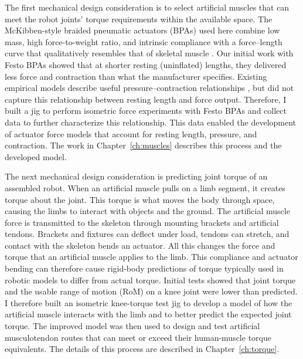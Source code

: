 The first mechanical design consideration is to select artificial muscles that can meet the robot joints' torque requirements within the available space. The McKibben-style braided pneumatic actuators (BPAs) used here combine low mass, high force-to-weight ratio, and intrinsic compliance with a force--length curve that qualitatively resembles that of skeletal muscle \citep{liang_comparative_2020, hunt_modeling_2017}. Our initial work with Festo BPAs showed that at shorter resting (uninflated) lengths, they delivered less force and contraction than what the manufacturer specifies. Existing empirical models describe useful pressure--contraction relationships \citep{sarosi_comparative_2017, martens_modeling_2017, hunt_modeling_2017}, but did not capture this relationship between resting length and force output. Therefore, I built a jig to perform isometric force experiments with Festo BPAs and collect data to further characterize this relationship. This data enabled the development of actuator force models that account for resting length, pressure, and contraction. The work in Chapter~\ref{ch:muscles} describes this process and the developed model.

The next mechanical design consideration is predicting joint torque of an assembled robot. When an artificial muscle pulls on a limb segment, it creates torque about the joint. This torque is what moves the body through space, causing the limbs to interact with objects and the ground. The artificial muscle force is transmitted to the skeleton through mounting brackets and artificial tendons. Brackets and fixtures can deflect under load, tendons can stretch, and contact with the skeleton bends an actuator. All this changes the force and torque that an artificial muscle applies to the limb. This compliance and actuator bending can therefore cause rigid-body predictions of torque typically used in robotic models to differ from actual torque. Initial tests showed that joint torque and the usable range of motion (RoM) on a knee joint were lower than predicted. I therefore built an isometric knee-torque test jig to develop a model of how the artificial muscle interacts with the limb and to better predict the expected joint torque. The improved model was then used to design and test artificial musculotendon routes that can meet or exceed their human-muscle torque equivalents. The details of this process are described in Chapter~\ref{ch:torque}.

